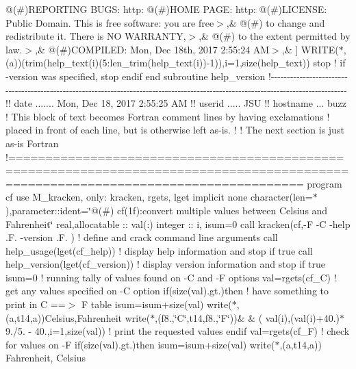 \begin{DoxyCompactItemize}
\textquotesingle{}@(\#)\+R\+E\+P\+O\+R\+T\+I\+N\+G B\+U\+G\+S\+: http\+: \textquotesingle{}@(\#)\+H\+O\+M\+E P\+A\+G\+E\+: http\+: \textquotesingle{}@(\#)\+L\+I\+C\+E\+N\+S\+E\+: Public Domain. This is free software\+: you are free$>$\textquotesingle{},\& \textquotesingle{}@(\#) to change and redistribute it. There is N\+O W\+A\+R\+R\+A\+N\+T\+Y,$>$\textquotesingle{},\& \textquotesingle{}@(\#) to the extent permitted by law.$>$\textquotesingle{},\& \textquotesingle{}@(\#)\+C\+O\+M\+P\+I\+L\+E\+D\+: Mon, Dec 18th, 2017 2\+:55\+:24 A\+M$>$\textquotesingle{},\& \textquotesingle{}\textquotesingle{}\mbox{]} W\+R\+I\+T\+E($\ast$,\textquotesingle{}(a)\textquotesingle{})(trim(help\+\_\+text(i)(5\+:len\+\_\+trim(help\+\_\+text(i))-\/1)),i=1,size(help\+\_\+text)) stop ! if -\/version was specified, stop endif end subroutine help\+\_\+version !-\/-\/-\/-\/-\/-\/-\/-\/-\/-\/-\/-\/-\/-\/-\/-\/-\/-\/-\/-\/-\/-\/-\/-\/-\/-\/-\/-\/-\/-\/-\/-\/-\/-\/-\/-\/-\/-\/-\/-\/-\/-\/-\/-\/-\/-\/-\/-\/-\/-\/-\/-\/-\/-\/-\/-\/-\/-\/-\/-\/-\/-\/-\/-\/-\/-\/-\/-\/-\/-\/-\/-\/-\/-\/-\/-\/-\/-\/-\/-\/-\/-\/-\/-\/-\/-\/-\/-\/-\/-\/-\/-\/-\/-\/-\/-\/-\/-\/-\/-\/-\/-\/-\/-\/-\/-\/-\/-\/-\/-\/-\/-\/-\/-\/-\/-\/-\/-\/-\/-\/-\/-\/-\/-\/-\/-\/-\/-\/-\/-\/-\/ !! date ....... Mon, Dec 18, 2017 2\+:55\+:25 A\+M !! userid ..... J\+S\+U !! hostname ... buzz ! This block of text becomes Fortran comment lines by having exclamations ! placed in front of each line, but is otherwise left as-\/is. ! ! The next section is just as-\/is Fortran !=================================================================================================================================== program cf use M\+\_\+kracken, only\+: kracken, rgets, lget implicit none character(len=$\ast$),parameter\+::ident=\char`\"{}@(\#) cf(1f)\+:convert multiple values between Celsius and Fahrenheit\char`\"{} real,allocatable \+:: val(\+:) integer \+:: i, isum=0 call kracken(\textquotesingle{}cf\textquotesingle{},\textquotesingle{}-\/\+F -\/\+C -\/help .\+F. -\/version .\+F.\textquotesingle{} ) ! define and crack command line arguments call help\+\_\+usage(lget(\textquotesingle{}cf\+\_\+help\textquotesingle{})) ! display help information and stop if true call help\+\_\+version(lget(\textquotesingle{}cf\+\_\+version\textquotesingle{})) ! display version information and stop if true isum=0 ! running tally of values found on -\/\+C and -\/\+F options val=rgets(\textquotesingle{}cf\+\_\+\+C\textquotesingle{}) ! get any values specified on -\/\+C option if(size(val).\+gt.)then ! have something to print in C ==$>$ F table isum=isum+size(val) write($\ast$,\textquotesingle{}(a,t14,a)\textquotesingle{})\textquotesingle{}\+Celsius\textquotesingle{},\textquotesingle{}\+Fahrenheit\textquotesingle{} write($\ast$,\textquotesingle{}(f8.,\char`\"{}\+C\char`\"{},t14,f8.,\char`\"{}\+F\char`\"{})\textquotesingle{})\& \& ( val(i),(val(i)+40.)$\ast$9./5. -\/ 40.,i=1,size(val)) ! print the requested values endif val=rgets(\textquotesingle{}cf\+\_\+\+F\textquotesingle{}) ! check for values on -\/\+F if(size(val).\+gt.)then isum=isum+size(val) write($\ast$,\textquotesingle{}(a,t14,a)\textquotesingle{}) \textquotesingle{}\+Fahrenheit\textquotesingle{}, \textquotesingle{}\+Celsius\textquotesingle{} 
\end{DoxyCompactItemize}
